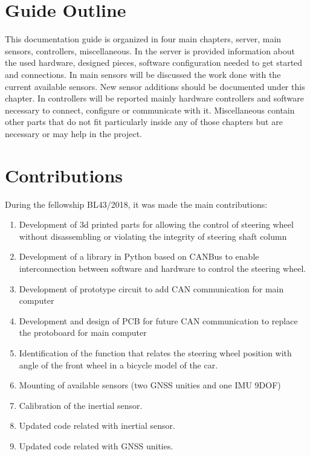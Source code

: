 \section{Guide Outline}
\label{section:outline} 

This documentation guide is organized in four main chapters, server, main sensors, controllers, miscellaneous.
In the server is provided information about the used hardware, designed pieces, software configuration needed to get started and connections.
In main sensors will be discussed the work done with the current available sensors. New sensor additions should be documented under this chapter.
In controllers will be reported mainly hardware controllers and software necessary to connect, configure  or communicate with it.
Miscellaneous contain other parts that do not fit particularly inside any of those chapters but are necessary or may help in the project.

 

\section{Contributions}
\label{section:contributions}

During the fellowship BL43/2018, it was made the main contributions:
\begin{enumerate}
	\tightlist
	\item Development of 3d printed parts for allowing the control of steering wheel without disassembling or violating the integrity of steering shaft column
	\item Development of a library in Python based on CANBus to enable interconnection between software and hardware to control the steering wheel.
	\item Development of prototype circuit to add CAN communication for main computer
	\item Development and design of \acrshort{PCB} for future CAN communication to replace the protoboard for main computer
	\item Identification of the function that relates the steering wheel position with angle of the front wheel in a bicycle model of the car.
	\item Mounting of available sensors (two  \acrshort{GNSS} unities and one \acrshort{IMU} \acrshort{9DOF})
	\item Calibration of the inertial sensor.
	\item Updated code related with inertial sensor.
	\item Updated code related with \acrshort{GNSS} unities.
\end{enumerate}

